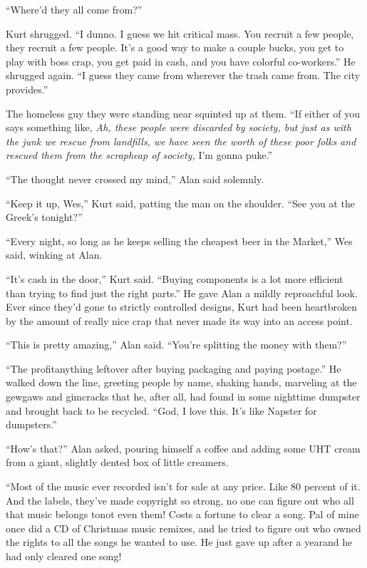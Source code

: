 ``Where'd they all come from?''

Kurt shrugged.  ``I dunno.  I guess we hit critical mass.  You recruit
a few people, they recruit a few people.  It's a good way to make a
couple bucks, you get to play with boss crap, you get paid in cash,
and you have colorful co-workers.'' He shrugged again.  ``I guess they
came from wherever the trash came from.  The city provides.''

The homeless guy they were standing near squinted up at them.  ``If
either of you says something like, \textit{Ah, these people were
discarded by society, but just as with the junk we rescue from
landfills, we have seen the worth of these poor folks and rescued them
from the scrapheap of society,} I'm gonna puke.''

``The thought never crossed my mind,'' Alan said solemnly.

``Keep it up, Wes,'' Kurt said, patting the man on the shoulder. 
``See you at the Greek's tonight?''

``Every night, so long as he keeps selling the cheapest beer in the
Market,'' Wes said, winking at Alan.

``It's cash in the door,'' Kurt said.  ``Buying components is a lot
more efficient than trying to find just the right parts.'' He gave
Alan a mildly reproachful look.  Ever since they'd gone to strictly
controlled designs, Kurt had been heartbroken by the amount of really
nice crap that never made its way into an access point.

``This is pretty amazing,'' Alan said.  ``You're splitting the money
with them?''

``The profit\dash{}anything leftover after buying packaging and paying
postage.'' He walked down the line, greeting people by name, shaking
hands, marveling at the gewgaws and gimcracks that he, after all, had
found in some nighttime dumpster and brought back to be recycled. 
``God, I love this.  It's like Napster for dumpsters.''

``How's that?'' Alan asked, pouring himself a coffee and adding some
UHT cream from a giant, slightly dented box of little creamers.

``Most of the music ever recorded isn't for sale at any price.  Like
80 percent of it.  And the labels, they've made copyright so strong,
no one can figure out who all that music belongs to\dash{}not even them! 
Costs a fortune to clear a song.  Pal of mine once did a CD of
Christmas music remixes, and he tried to figure out who owned the
rights to all the songs he wanted to use.  He just gave up after a
year\dash{}and he had only cleared one song!

